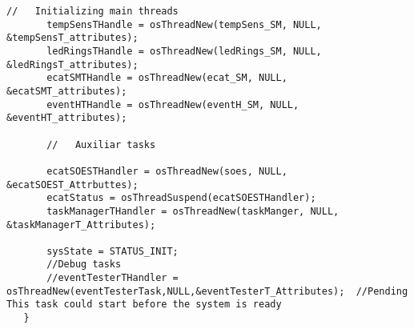 \begin{lstlisting}[label=lst:generalSM,caption={Part of the code to declare threads and other auxiliar functions.}]
       //	Initializing main threads
       tempSensTHandle = osThreadNew(tempSens_SM, NULL, &tempSensT_attributes);
       ledRingsTHandle = osThreadNew(ledRings_SM, NULL, &ledRingsT_attributes);
       ecatSMTHandle = osThreadNew(ecat_SM, NULL, &ecatSMT_attributes);
       eventHTHandle = osThreadNew(eventH_SM, NULL, &eventHT_attributes);
   
       //	Auxiliar tasks
   
       ecatSOESTHandler = osThreadNew(soes, NULL, &ecatSOEST_Attrbuttes);
       ecatStatus = osThreadSuspend(ecatSOESTHandler);
       taskManagerTHandler = osThreadNew(taskManger, NULL, &taskManagerT_Attributes);
   
       sysState = STATUS_INIT;
       //Debug tasks
       //eventTesterTHandler = osThreadNew(eventTesterTask,NULL,&eventTesterT_Attributes);	//Pending This task could start before the system is ready
   }

\end{lstlisting}

